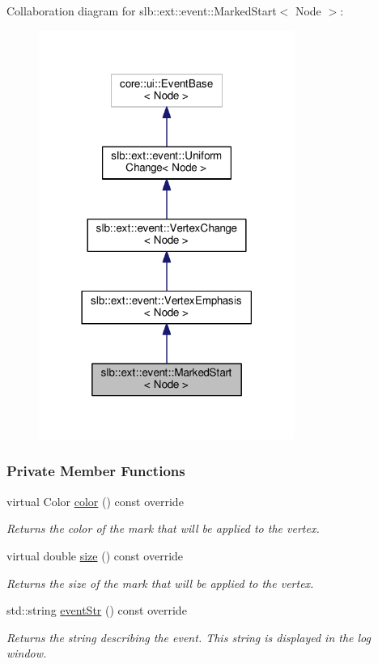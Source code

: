 Collaboration diagram for slb\+:\+:ext\+:\+:event\+:\+:Marked\+Start$<$ Node $>$\+:\nopagebreak
\begin{figure}[H]
\begin{center}
\leavevmode
\includegraphics[width=237pt]{structslb_1_1ext_1_1event_1_1MarkedStart__coll__graph}
\end{center}
\end{figure}
\subsubsection*{Private Member Functions}
\begin{DoxyCompactItemize}
\item 
virtual Color \hyperlink{structslb_1_1ext_1_1event_1_1MarkedStart_a49fad76505df1329aaf12ad750c3cded}{color} () const override
\begin{DoxyCompactList}\small\item\em Returns the color of the mark that will be applied to the vertex. \end{DoxyCompactList}\item 
virtual double \hyperlink{structslb_1_1ext_1_1event_1_1MarkedStart_a3cb9f9dd7102e1223b481ab935d7e524}{size} () const override
\begin{DoxyCompactList}\small\item\em Returns the size of the mark that will be applied to the vertex. \end{DoxyCompactList}\item 
std\+::string \hyperlink{structslb_1_1ext_1_1event_1_1MarkedStart_abd3881ec001c3ed94e22f80a4673513c}{event\+Str} () const override
\begin{DoxyCompactList}\small\item\em Returns the string describing the event. This string is displayed in the log window. \end{DoxyCompactList}\end{DoxyCompactItemize}
